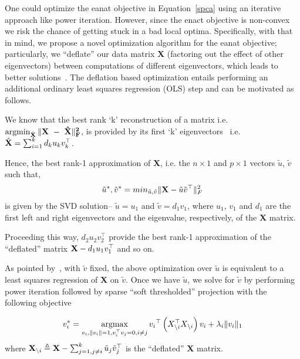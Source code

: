 \documentclass{elsarticle}\usepackage{graphicx, color}
\newcommand{\argmax}{\operatornamewithlimits{argmax}}
\newcommand{\argmin}{\operatornamewithlimits{argmin}}
\begin{document}
One could optimize the eanat objective in Equation~\ref{spca} using an iterative approach like power iteration. However, since the enact objective is non-convex we risk the chance of getting stuck in a bad local optima. Specifically, with that in mind, we propose a novel optimization algorithm for the eanat objective; particularly, we ``deflate'' our data matrix {\bf X} (factoring out the effect of other eigenvectors) between computations of different eigenvectors, which leads to better solutions~\citep{mackey08}. The deflation based optimization entails performing an additional ordinary least squares regression (OLS) step and can be motivated as follows.


We know that the best rank `k' reconstruction of a matrix  i.e. $\argmin_{\hat{\bf X}} \|\bf X~-~\hat{X} \|_F^2$, is provided by its first `k' eigenvectors~\citep{eckart} i.e. $\hat{\bf X}=\sum_{i=1}^k d_k{u}_k{v}_k^{\top}$.

Hence, the best rank-1 approximation of {\bf X}, i.e. the $n\times 1$ and $p \times 1$ vectors ${\tilde{u}}$, ${\tilde{v}}$ such that,
\begin{equation}
\label{ppca1}
{\tilde{u}^*, \tilde{v}^*}= min_{{\tilde{u}}, {\tilde{v}}} \|{{\bf X}- \tilde{u}\tilde{v}^{\top}}\|_F^2
\end{equation}
is given by the SVD solution-- ${\tilde{u}=u_1}$ and ${\tilde{v}}=d_1{v_1}$, where ${u_1 }$, ${v_1}$ and $d_1$ are the first left and right eigenvectors and the eigenvalue, respectively, of the {\bf X} matrix.   

Proceeding this way, $d_2{u}_2{v}_2^{\top}$ provide the best rank-1 approximation of the ``deflated'' matrix ${{\bf X}- d_1{u}_1{v}_1^{\top}}$ and so on. 


As pointed by~\citep{shen},  with ${\tilde{v}}$ fixed, the above optimization over  ${\tilde{u}}$ is equivalent to a least squares regression of {\bf X} on  ${\tilde{v}}$. Once we have ${\tilde{u}}$, we solve for ${\tilde{v}}$ by performing power iteration followed by sparse ``soft thresholded'' projection with the following objective

\begin{equation}
\label{spca1}
{v_i^*}= \argmax_{{v_i},{\|v_i\|}=1,  v_i^{\top}v_j=0, i\neq j} {v_i}^{\top}\left(X_{\backslash i}^{\top}X_{\backslash i} \right){v_i} +  \lambda_i\|{v_i}\|_1 
\end{equation}
where ${\bf X}_{\backslash i}  \triangleq {\bf X}- \sum_{j=1, j\neq i}^{k}{\tilde{u}_j\tilde{v}_j^{\top}}$ is the ``deflated'' {\bf X} matrix.
\end{document}

